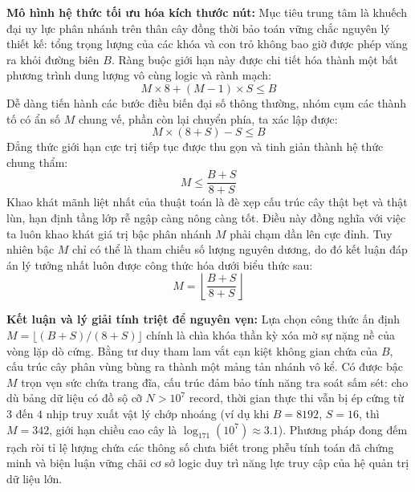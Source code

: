 \documentclass[12pt,a4paper]{article}
\begin{document}
\textbf{Mô hình hệ thức tối ưu hóa kích thước nút:} 
Mục tiêu trung tâm là khuếch đại uy lực phân nhánh trên thân cây đồng thời bảo toán vững chắc nguyên lý thiết kế: tổng trọng lượng của các khóa và con trỏ không bao giờ được phép văng ra khỏi đường biên $B$. Ràng buộc giới hạn này được chi tiết hóa thành một bất phương trình dung lượng vô cùng logic và rành mạch:
\begin{equation}
    M \times 8 + (M - 1) \times S \leq B
\end{equation}
Dễ dàng tiến hành các bước điều biến đại số thông thường, nhóm cụm các thành tố có ẩn số $M$ chung vế, phần còn lại chuyển phía, ta xác lập được:
\begin{equation}
    M \times (8 + S) - S \leq B
\end{equation}
Đẳng thức giới hạn cực trị tiếp tục được thu gọn và tinh giản thành hệ thức chung thẩm:
\begin{equation}
    M \leq \frac{B + S}{8 + S}
\end{equation}
Khao khát mãnh liệt nhất của thuật toán là đè xẹp cấu trúc cây thật bẹt và thật lùn, hạn định tầng lớp rễ ngập càng nông càng tốt. Điều này đồng nghĩa với việc ta luôn khao khát giá trị bậc phân nhánh $M$ phải chạm dần lên cực đỉnh. Tuy nhiên bậc $M$ chỉ có thể là tham chiếu số lượng nguyên dương, do đó kết luận đáp án lý tưởng nhất luôn được công thức hóa dưới biểu thức sau:
\begin{equation}
    M = \left\lfloor \frac{B + S}{8 + S} \right\rfloor
\end{equation}

\textbf{Kết luận và lý giải tính triệt để nguyên vẹn:}
Lựa chọn công thức ấn định $M = \lfloor (B + S)/(8 + S) \rfloor$ chính là chìa khóa thần kỳ xóa mờ sự nặng nề của vòng lặp dò cứng. Bằng tư duy tham lam vắt cạn kiệt không gian chứa của $B$, cấu trúc cây phân vùng bùng ra thành một mảng tản nhánh vô kể. Có được bậc $M$ trọn vẹn sức chứa trang đĩa, cấu trúc đảm bảo tính năng tra soát sấm sét: cho dù bảng dữ liệu có đồ sộ cỡ $N > 10^7$ record, thời gian thực thi vẫn bị ép cứng từ $3$ đến $4$ nhịp truy xuất vật lý chớp nhoáng (ví dụ khi $B=8192$, $S=16$, thì $M=342$, giới hạn chiều cao cây là $\log_{171}{(10^7)} \approx 3.1$). Phương pháp đong đếm rạch ròi tỉ lệ lượng chứa các thông số chưa biết trong phễu tính toán đã chứng minh và biện luận vững chãi cơ sở logic duy trì năng lực truy cập của hệ quản trị dữ liệu lớn.
\end{document}

